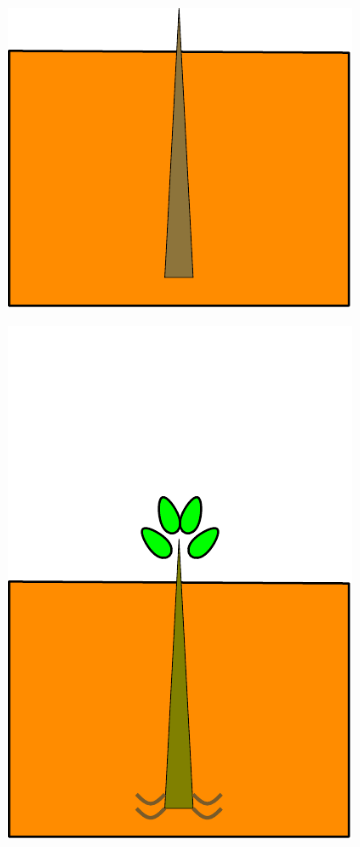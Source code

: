 \documentclass[10pt]{article}
\begin{document}
\begin{figure}[!ht]
\begin{subfigure}[b]{.1125\linewidth}
\centering
\includegraphics[width=1.0\linewidth]{img/tree_pics_1}
\caption{}  %
\label{fig:grow_1}
\end{subfigure}
\begin{subfigure}[b]{.1125\linewidth}
\centering
\includegraphics[width=1.0\linewidth]{img/tree_pics_2}

\end{subfigure}
\end{figure}
\end{document}
